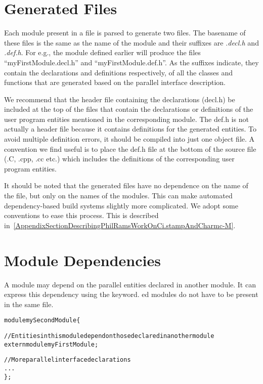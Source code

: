 \section{Generated Files}

Each module present in a \ci file is parsed to generate two files. The basename
of these files is the same as the name of the module and their suffixes are
\emph{.decl.h} and \emph{.def.h}. For e.g., the module defined earlier will
produce the files ``myFirstModule.decl.h'' and ``myFirstModule.def.h''. As the
suffixes indicate, they contain the declarations and definitions respectively,
of all the classes and functions that are generated based on the parallel
interface description.

We recommend that the header file containing the declarations (decl.h) be
included at the top of the files that contain the declarations or definitions
of the user program entities mentioned in the corresponding module. The def.h
is not actually a header file because it contains definitions for the generated
entities. To avoid multiple definition errors, it should be compiled into just
one object file. A convention we find useful is to place the def.h file at the
bottom of the source file (.C, .cpp, .cc etc.) which includes the definitions
of the corresponding user program entities.

\experimental
It should be noted that the generated files have no dependence on the name of the \ci
file, but only on the names of the modules. This can make automated dependency-based
build systems slightly more complicated. We adopt some conventions to ease this process.
This is described in~\ref{AppendixSectionDescribingPhilRamsWorkOnCi.stampAndCharmc-M}.


\section{Module Dependencies}

A module may depend on the parallel entities declared in another module. It can
express this dependency using the  keyword. ed modules
do not have to be present in the same \ci file.

\begin{alltt}
module mySecondModule \{

    // Entities in this module depend on those declared in another module
    extern module myFirstModule;

    // More parallel interface declarations
    ...
\};
\end{alltt}

